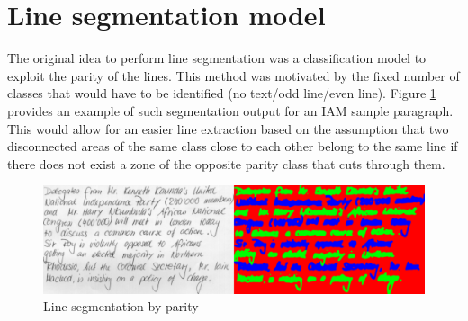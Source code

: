\section{Line segmentation model}
\label{sec:ch5sec3}

The original idea to perform line segmentation was a classification model to exploit the parity of the lines. This method was motivated by the fixed number of classes that would have to be identified (no text/odd line/even line). Figure \ref{FigParityLineSeg} provides an example of such segmentation output for an IAM sample paragraph. This would allow for an easier line extraction based on the assumption that two disconnected areas of the same class close to each other belong to the same line if there does not exist a zone of the opposite parity class that cuts through them.

\begin{figure}[htbp]
    \centering
        \includegraphics[scale=0.7]{figures/segmentation_eo}
    \caption{Line segmentation by parity}
    \label{FigParityLineSeg}        
\end{figure}

